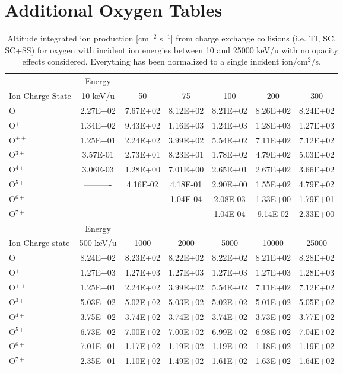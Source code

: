 \section{Additional Oxygen Tables}
\label{app:Oxy}

\begin{table}[ht]
    \centering
    \caption{Altitude integrated ion production [cm$^{-2}$ s$^{-1}$] from charge exchange collisions (i.e. TI, SC, SC+SS) for oxygen with incident ion energies between 10 and 25000 keV/u with no opacity effects considered. Everything has been normalized to a single incident ion/cm$^2$/s.}
    \begin{tabular}{l|c|c|c|c|c|c}
    \hline
    & Energy & & & & & \\
    Ion Charge State & 10 keV/u & 50 & 75 & 100 & 200 & 300 \\
    \hline
    O & 2.27E+02 & 7.67E+02 & 8.12E+02 & 8.21E+02 & 8.26E+02 & 8.24E+02 \\
    O$^+$ & 1.34E+02 & 9.43E+02 & 1.16E+03 & 1.24E+03 & 1.28E+03 & 1.27E+03 \\
    O$^{++}$ & 1.25E+01 & 2.24E+02 & 3.99E+02 & 5.54E+02 & 7.11E+02 & 7.12E+02 \\
    O$^{3+}$ & 3.57E-01 & 2.73E+01 & 8.23E+01 & 1.78E+02 & 4.79E+02 & 5.03E+02 \\
    O$^{4+}$ & 3.06E-03 & 1.28E+00 & 7.01E+00 & 2.65E+01 & 2.67E+02 & 3.66E+02 \\
    O$^{5+}$ & ---------- & 4.16E-02 & 4.18E-01 & 2.90E+00 & 1.55E+02 & 4.79E+02 \\
    O$^{6+}$ & ---------- & ---------- & 1.04E-04 & 2.08E-03 & 1.33E+00 & 1.79E+01 \\
    O$^{7+}$ & ---------- & ---------- & ---------- & 1.04E-04 & 9.14E-02 & 2.33E+00 \\
    \hline
    \hline
    & Energy & & & & & \\
    Ion Charge state & 500 keV/u & 1000 & 2000 & 5000 & 10000 & 25000 \\
    \hline
    O & 8.24E+02 & 8.23E+02 & 8.22E+02 & 8.22E+02 & 8.21E+02 & 8.28E+02 \\
    O$^+$ & 1.27E+03 & 1.27E+03 & 1.27E+03 & 1.27E+03 & 1.27E+03 & 1.28E+03 \\
    O$^{++}$ & 1.25E+01 & 2.24E+02 & 3.99E+02 & 5.54E+02 & 7.11E+02 & 7.12E+02 \\
    O$^{3+}$ & 5.03E+02 & 5.02E+02 & 5.03E+02 & 5.02E+02 & 5.01E+02 & 5.05E+02 \\
    O$^{4+}$ & 3.75E+02 & 3.74E+02 & 3.74E+02 & 3.74E+02 & 3.73E+02 & 3.77E+02 \\
    O$^{5+}$ & 6.73E+02 & 7.00E+02 & 7.00E+02 & 6.99E+02 & 6.98E+02 & 7.04E+02 \\
    O$^{6+}$ & 7.01E+01 & 1.17E+02 & 1.19E+02 & 1.19E+02 & 1.18E+02 & 1.19E+02 \\
    O$^{7+}$ & 2.35E+01 & 1.10E+02 & 1.49E+02 & 1.61E+02 & 1.63E+02 & 1.64E+02 \\
    \hline
    \end{tabular}
    \label{tab:OxyCXProd}
\end{table}

